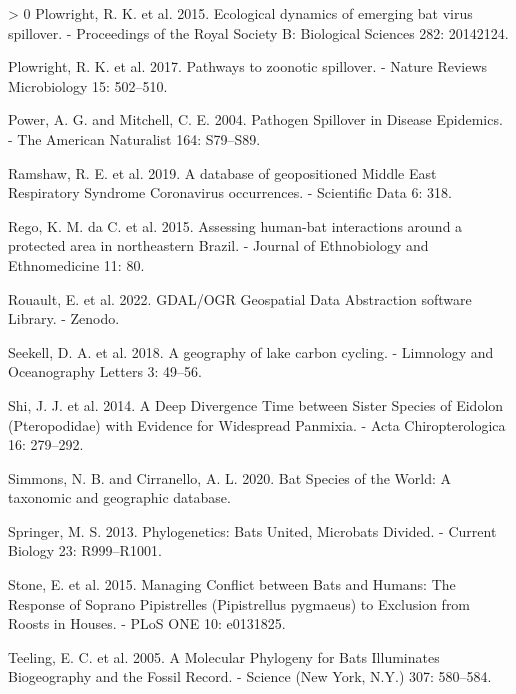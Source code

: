 \documentclass[11pt]{article}
\newlength{\cslhangindent}
\newenvironment{CSLReferences}[3] %
 {%
  \setlength{\parindent}{0pt}
  \ifodd #1 \everypar{\setlength{\hangindent}{\cslhangindent}}\ignorespaces\fi
  \ifnum #2 > 0
  \setlength{\parskip}{#2\baselineskip}
  \fi
 }%
 {}
\begin{document}
\begin{CSLReferences}{1}{0}
\leavevmode\hypertarget{ref-Plowright2015EcoDyn}{}%
Plowright, R. K. et al. 2015. Ecological dynamics of emerging bat virus
spillover. - Proceedings of the Royal Society B: Biological Sciences
282: 20142124.

\leavevmode\hypertarget{ref-Plowright2017PatZoo}{}%
Plowright, R. K. et al. 2017. Pathways to zoonotic spillover. - Nature
Reviews Microbiology 15: 502--510.

\leavevmode\hypertarget{ref-Power2004PatSpi}{}%
Power, A. G. and Mitchell, C. E. 2004. Pathogen Spillover in Disease
Epidemics. - The American Naturalist 164: S79--S89.

\leavevmode\hypertarget{ref-Ramshaw2019DatGeo}{}%
Ramshaw, R. E. et al. 2019. A database of geopositioned Middle East
Respiratory Syndrome Coronavirus occurrences. - Scientific Data 6: 318.

\leavevmode\hypertarget{ref-Rego2015AssHum}{}%
Rego, K. M. da C. et al. 2015. Assessing human-bat interactions around a
protected area in northeastern Brazil. - Journal of Ethnobiology and
Ethnomedicine 11: 80.

\leavevmode\hypertarget{ref-RouaultEven2022GdaOgr}{}%
Rouault, E. et al. 2022. GDAL/OGR Geospatial Data Abstraction software
Library. - Zenodo.

\leavevmode\hypertarget{ref-Seekell2018GeoLak}{}%
Seekell, D. A. et al. 2018. A geography of lake carbon cycling. -
Limnology and Oceanography Letters 3: 49--56.

\leavevmode\hypertarget{ref-Shi2014DeeDiv}{}%
Shi, J. J. et al. 2014. A Deep Divergence Time between Sister Species of
Eidolon (Pteropodidae) with Evidence for Widespread Panmixia. - Acta
Chiropterologica 16: 279--292.

\leavevmode\hypertarget{ref-Simmons2020BatSpe}{}%
Simmons, N. B. and Cirranello, A. L. 2020. Bat Species of the World: A
taxonomic and geographic database.

\leavevmode\hypertarget{ref-Springer2013PhyBat}{}%
Springer, M. S. 2013. Phylogenetics: Bats United, Microbats Divided. -
Current Biology 23: R999--R1001.

\leavevmode\hypertarget{ref-Stone2015ManCon}{}%
Stone, E. et al. 2015. Managing Conflict between Bats and Humans: The
Response of Soprano Pipistrelles (Pipistrellus pygmaeus) to Exclusion
from Roosts in Houses. - PLoS ONE 10: e0131825.

\leavevmode\hypertarget{ref-Teeling2005MolPhy}{}%
Teeling, E. C. et al. 2005. A Molecular Phylogeny for Bats Illuminates
Biogeography and the Fossil Record. - Science (New York, N.Y.) 307:
580--584.


\end{CSLReferences}
\end{document}
